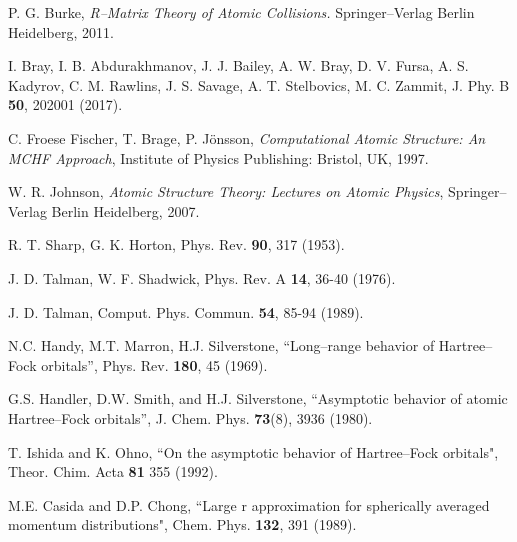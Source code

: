 \begin{thebibliography}{9}

P. G. Burke, 
\textit{R--Matrix Theory of Atomic Collisions.}
Springer--Verlag Berlin Heidelberg, 2011.

I. Bray, I. B. Abdurakhmanov, J. J. Bailey, A. W. Bray, D. V. Fursa,
A. S. Kadyrov, C. M. Rawlins, J. S. Savage, A. T. Stelbovics, M. C. Zammit,
J. Phy. B \textbf{50}, 202001 (2017).


C. Froese Fischer, T. Brage, P. J\"onsson,
\textit{Computational Atomic Structure: An MCHF Approach},
Institute of Physics Publishing: Bristol, UK, 1997.

W. R. Johnson, 
\textit{Atomic Structure Theory: Lectures on Atomic Physics},
Springer--Verlag Berlin Heidelberg, 2007.

R. T. Sharp, G. K. Horton,
Phys. Rev. \textbf{90}, 317 (1953).

J. D. Talman, W. F. Shadwick, 
Phys. Rev. A \textbf{14}, 36-40 (1976).

J. D. Talman, 
Comput. Phys. Commun. \textbf{54}, 85-94 (1989).


N.C. Handy, M.T. Marron, H.J. Silverstone, 
``Long--range behavior of Hartree--Fock orbitals'',
Phys. Rev. {\bf 180}, 45 (1969).

G.S. Handler, D.W. Smith, and H.J. Silverstone, 
``Asymptotic behavior of atomic Hartree--Fock orbitals'',
J. Chem. Phys. {\bf 73}(8), 3936 (1980).

T. Ishida and K. Ohno, 
``On the asymptotic behavior of Hartree--Fock orbitals", 
Theor. Chim. Acta {\bf 81} 355 (1992).

M.E. Casida and D.P. Chong, 
``Large r approximation for spherically averaged momentum distributions",
Chem. Phys. {\bf 132}, 391 (1989).

\begin{comment}


\end{comment}
\end{thebibliography}
